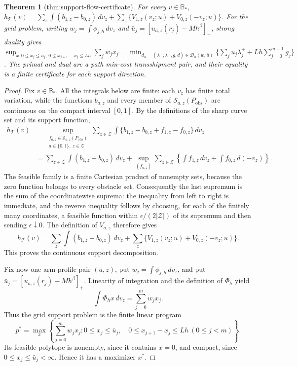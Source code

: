 \documentclass{article}
\newtheorem{theorem}{Theorem}
\begin{document}
\begin{theorem}[thm:support-flow-certificate]\label{thm:support-flow-certificate}
For every \(v\in\mathbb B_*\), \(h_{\mathcal T}(v)=\sum_z\int(b_{1,z}-b_{0,z})\,dv_z+\sum_z\{V_{1,z}(v_z;u)+V_{0,z}(-v_z;u)\}\). For the grid problem, writing \(w_j=\int\phi_{j,h}\,dv_z\) and \(\bar u_j=[u_{a,z}(r_j)-Mh^\beta]_+\), strong duality gives \(\sup_{x:0\le x_j\le\bar u_j,\,0\le x_{j+1}-x_j\le Lh}\sum_jw_jx_j=\min_{d_h=(\lambda^+,\lambda^-,g,d)\in\mathcal D_h(w,\bar u)}\{\sum_j\bar u_j\lambda_j^+ +Lh\sum_{j=0}^{m-1}g_j\}\). The primal and dual are a path min-cost transshipment pair, and their equality is a finite certificate for each support direction.
\end{theorem}
\begin{proof}
Fix \(v\in\mathbb B_*\).  All the integrals below are finite: each
\(v_z\) has finite total variation, while the functions \(b_{a,z}\) and
every member of \(\mathcal S_{a,z}(P_{\mathrm{obs}})\) are continuous on
the compact interval \([0,1]\).  By the definitions of the sharp curve
set and its support function,
\[
\begin{aligned}
h_{\mathcal T}(v)
&=\sup_{\substack{f_{a,z}\in\mathcal S_{a,z}(P_{\mathrm{obs}})\\
                   a\in\{0,1\},\ z\in\mathcal Z}}
 \sum_{z\in\mathcal Z}\int
 \{b_{1,z}-b_{0,z}+f_{1,z}-f_{0,z}\}\,dv_z \\
&=\sum_{z\in\mathcal Z}\int(b_{1,z}-b_{0,z})\,dv_z
  +\sup_{(f_{a,z})}\sum_{z\in\mathcal Z}
       \left\{\int f_{1,z}\,dv_z+\int f_{0,z}\,d(-v_z)\right\}.
\end{aligned}
\]
The feasible family is a finite Cartesian product of nonempty sets, because
the zero function belongs to every obstacle set.  Consequently the last
supremum is the sum of the coordinatewise suprema: the inequality from left
to right is immediate, and the reverse inequality follows by choosing, for
each of the finitely many coordinates, a feasible function within
\(\epsilon/(2|\mathcal Z|)\) of its supremum and then sending
\(\epsilon\downarrow0\).  The definition of \(V_{a,z}\) therefore gives
\[
h_{\mathcal T}(v)
=\sum_z\int(b_{1,z}-b_{0,z})\,dv_z
 +\sum_z\{V_{1,z}(v_z;u)+V_{0,z}(-v_z;u)\}.
\]
This proves the continuous support decomposition.

Fix now one arm-profile pair \((a,z)\), put
\(w_j=\int\phi_{j,h}\,dv_z\), and put
\(\bar u_j=[u_{a,z}(r_j)-Mh^\beta]_+\).  Linearity of integration and the
definition of \(\Phi_h\) yield
\[
 \int\Phi_hx\,dv_z=\sum_{j=0}^m w_jx_j.
\]
Thus the grid support problem is the finite linear program
\[
 p^*=\max_x\left\{\sum_{j=0}^m w_jx_j:
 0\le x_j\le\bar u_j,\quad
 0\le x_{j+1}-x_j\le Lh\ (0\le j<m)\right\}.
\]
Its feasible polytope is nonempty, since it contains \(x=0\), and compact,
since \(0\le x_j\le\bar u_j<\infty\).  Hence it has a maximizer \(x^*\).


\end{proof}
\end{document}
